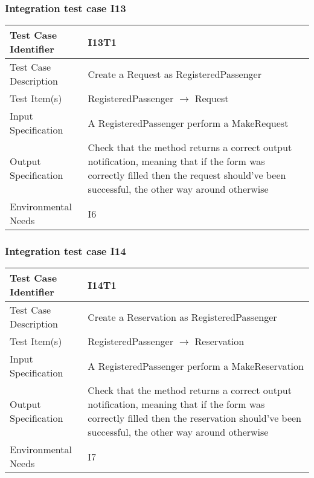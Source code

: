 		\subsubsection{Integration test case I13}
		\begin{center}
			\begin{tabular}{ |l p{10cm}| } \hline
				Test Case Identifier & I13T1 \\ \hline
				Test Case Description & Create a Request as RegisteredPassenger \\ \hline
				Test Item(s) & RegisteredPassenger $\rightarrow$ Request \\ \hline
				Input Specification & A RegisteredPassenger perform a MakeRequest \\ \hline
				Output Specification & Check that the method returns a correct output notification, meaning that if the form was correctly filled then
				the request should've been successful, the other way around otherwise\\ \hline
				Environmental Needs & I6 \\ \hline
			\end{tabular}
		\end{center}
		\subsubsection{Integration test case I14}
		\begin{center}
			\begin{tabular}{ |l p{10cm}| } \hline
				Test Case Identifier & I14T1 \\ \hline
				Test Case Description & Create a Reservation as RegisteredPassenger \\ \hline
				Test Item(s) & RegisteredPassenger $\rightarrow$ Reservation \\ \hline
				Input Specification & A RegisteredPassenger perform a MakeReservation \\ \hline
				Output Specification & Check that the method returns a correct output notification, meaning that if the form was correctly filled then
				the reservation should've been successful, the other way around otherwise\\ \hline
				Environmental Needs & I7 \\ \hline
			\end{tabular}
		\end{center}
